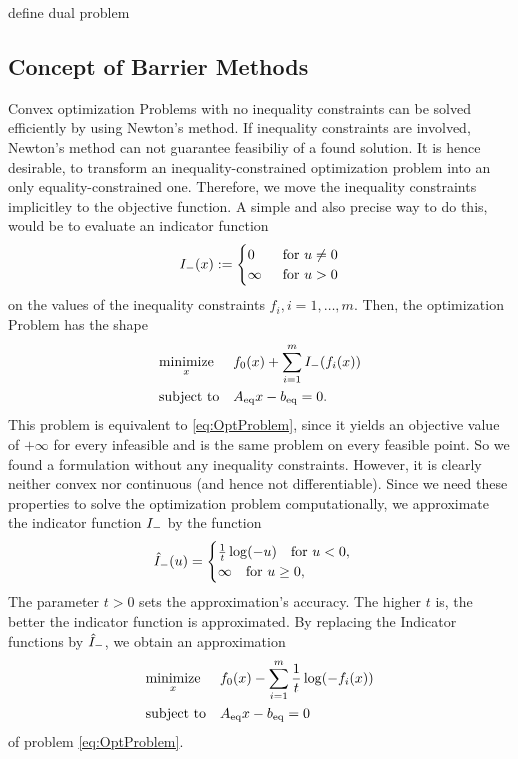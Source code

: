 \todo define dual problem
\subsection{Concept of Barrier Methods}
Convex optimization Problems with no inequality constraints can  be solved efficiently by using Newton's method. If inequality constraints are involved, Newton's method can not guarantee feasibiliy of a found solution. It is hence desirable, to transform an inequality-constrained optimization problem into an only equality-constrained one. Therefore, we move the inequality constraints implicitley to the objective function.
A simple and also precise way to do this, would be to evaluate an  indicator function  
\begin{align}
	{I}_{\mathrm{-}} (x) :=
	\begin{cases}
		0 \quad &\text{for } u \neq 0\\
		\infty &\text{for } u > 0
	\end{cases}
\end{align}
on the values of the inequality constraints $ f_i, i=1,\dots,m $. Then, the optimization Problem has the shape
\begin{align}
	\begin{aligned}
	& \underset{x}{\text{minimize}}
	& & f_0(x) + \sum_{i=1}^{m} {I}_{\mathrm{-}}(f_i(x))\\
	& \text{subject to}
	& & {A}_{\mathrm{eq}} x - {b}_{\mathrm{eq}} = 0.
	\end{aligned} \label{eq:ifctProblem}
\end{align}
This problem is equivalent to \eqref{eq:OptProblem}, since it yields an objective value of $ +\infty  $ for every infeasible and is the same problem on every feasible point. So we found a formulation without any inequality constraints. However, it is clearly neither convex nor continuous (and hence not differentiable). Since we need these properties to solve the optimization problem computationally, we approximate the indicator function $ {I}_{\mathrm{-}} $ by the function
\begin{equation}
	{\hat{I}}_{\mathrm{-}} (u) =
	\begin{cases}
	 \frac{1}{t}\log(-u) \quad \text{for } u < 0,\\
	 \infty \quad \text{for } u\geq 0,
	\end{cases}
\end{equation}
The parameter $ t>0 $ sets the approximation's accuracy. The higher $ t $ is, the better the indicator function is approximated.
By replacing the Indicator functions by $ {\hat{I}}_{\mathrm{-}} $, we obtain an
approximation 
\begin{equation}
\begin{aligned}
& \underset{x}{\text{minimize}}
& & f_0(x) - \sum_{i=1}^{m} \frac{1}{t} \log(-f_i(x)) \\
& \text{subject to}
& & {A}_{\mathrm{eq}} x - {b}_{\mathrm{eq}} = 0
\end{aligned} \label{eq:ApproxProblem}
\end{equation}
of problem \eqref{eq:OptProblem}.

